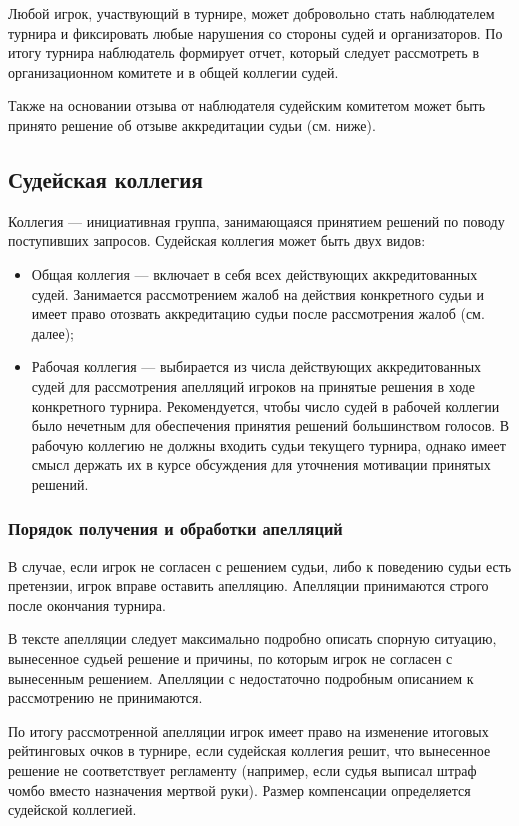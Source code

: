 Любой игрок, участвующий в турнире, может добровольно стать наблюдателем турнира и фиксировать любые нарушения со стороны судей и организаторов. По итогу турнира наблюдатель формирует отчет, который следует рассмотреть в организационном комитете и в общей коллегии судей. 

Также на основании отзыва от наблюдателя судейским комитетом может быть принято решение об отзыве аккредитации судьи (см. ниже).

\subsection{Судейская коллегия}

Коллегия --- инициативная группа, занимающаяся принятием решений по поводу поступивших запросов. Судейская коллегия может быть двух видов:

\begin{itemize}
	\item Общая коллегия --- включает в себя всех действующих аккредитованных судей. Занимается рассмотрением жалоб на действия конкретного судьи и имеет право отозвать аккредитацию судьи после рассмотрения жалоб (см. далее);
	\item Рабочая коллегия --- выбирается из числа действующих аккредитованных судей для рассмотрения апелляций игроков на принятые решения в ходе конкретного турнира. Рекомендуется, чтобы число судей в рабочей коллегии было нечетным для обеспечения принятия решений большинством голосов. В рабочую коллегию не должны входить судьи текущего турнира, однако имеет смысл держать их в курсе обсуждения для уточнения мотивации принятых решений.
\end{itemize}

\subsubsection{Порядок получения и обработки апелляций}

В случае, если игрок не согласен с решением судьи, либо к поведению судьи есть претензии, игрок вправе оставить апелляцию. Апелляции принимаются строго после окончания турнира.

В тексте апелляции следует максимально подробно описать спорную ситуацию, вынесенное судьей решение и причины, по которым игрок не согласен с вынесенным решением. Апелляции с недостаточно подробным описанием к рассмотрению не принимаются.

По итогу рассмотренной апелляции игрок имеет право на изменение итоговых рейтинговых очков в турнире, если судейская коллегия решит, что вынесенное решение не соответствует регламенту (например, если судья выписал штраф чомбо вместо назначения мертвой руки). Размер компенсации определяется судейской коллегией. 

